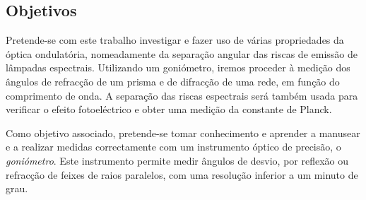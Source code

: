\begin{center}
\begin{minipage}[c][3cm][c]{\textwidth}
\begin{center}
\section*{\centering Objetivos}
    \vspace{-3mm}
\small
\justify
Pretende-se com este trabalho investigar e fazer uso de várias propriedades da óptica ondulatória, nomeadamente da separação angular das riscas de emissão de lâmpadas espectrais. Utilizando um goniómetro, iremos proceder à medição dos ângulos de refracção de um prisma e de difracção de uma rede, em função do comprimento de onda. A separação das riscas espectrais será também usada para verificar o efeito fotoeléctrico e obter uma medição da constante de Planck.

Como objetivo associado, pretende-se tomar conhecimento e aprender a manusear e a realizar medidas correctamente  com um instrumento óptico de precisão, o \emph{goniómetro}. Este instrumento permite medir ângulos de desvio, por reflexão ou refracção de feixes de raios paralelos, com uma resolução inferior a um minuto de grau.
    
\end{center}
\hline


\end{minipage}
\begin{minipage}[c][2cm][c]{\textwidth}
\centering

\end{minipage}

\end{center}
